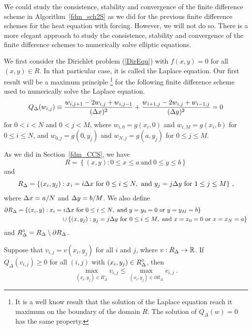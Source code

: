 We could study the consistence, stability and convergence of
the finite difference scheme in Algorithm~\ref{fdm_sch2S} as we did
for the previous finite difference schemes for the heat equation
with forcing.  However, we will not do so.  There is a more elegant
approach to study the consistence, stability and convergence of
the finite difference schemes to numerically solve elliptic equations.

We first consider the Dirichlet problem (\ref{DirEqu}) with  
$f(x,y) = 0$ for all $(x,y) \in R$.  In that particular case, it is
called the Laplace equation.  Our first result will be a
maximum principle \footnote{It is a well know result that the solution
of the Laplace equation reach it maximum on the boundary of the
domain $R$.  The solution of $Q_\Delta(w) = 0$ has the same property.}
for the following finite difference scheme used to numerically solve
the Laplace equation.
\[
Q_\Delta(w_{i,j}) \equiv \frac{w_{i,j+1} - 2w_{i,j} + w_{i,j-1}}{(\Delta{x})^2}
+ \frac{w_{i+1,j} - 2w_{i,j} + w_{i-1,j}}{(\Delta{y})^2} = 0
\]
for $0 < i < N$ and $0 < j < M$, where
$w_{i,0} = g(x_i,0)$ and $w_{i,M} = g(x_i,b)$ for $0\leq i \leq N$, and
$w_{0,j} = g(0,y_j)$ and $w_{N,j} = g(a,y_j)$ for $0\leq j \leq M$.

As we did in Section~\ref{fdm_CCS}, we have
\[
  R = \left\{ (x,y) : 0\leq x \leq a \ \text{and} \ 0 \leq y \leq b \right\}
\]
and
\[
R_\Delta = \{ (x_i,y_j) : x_i = i \dtx{x} \ \text{for} \ 0 \leq i \leq N,
\ \text{and} \ y_j = j \dtx{y} \ \text{for} \ 1 \leq j \leq M \} \ ,
\]
where $\Delta{x} = a/N$ and $\Delta{y}=b/M$.  We also define
\begin{align*}
\partial R_\Delta = \{ (x_i,y) : x_i &= i \Delta{x} \ \text{for}
\ 0 \leq i \leq N, \ \text{and} \ y = y_0 = 0 \ \text{or}\ y = y_M = b \} \\
& \quad  \cup
\{ (x,y_j) : y_j = j \Delta{y} \ \text{for} \ 0 \leq i \leq M,
\ \text{and} \ x = x_0 = 0 \ \text{or}\ x = x_N = a \}
\end{align*}
and $\displaystyle R^\circ_\Delta = R_\Delta \setminus \partial R_\Delta$.

\begin{theorem} \label{LaplaceMaxPrinc}
Suppose that $v_{i,j} = v(x_i,y_j)$ for all $i$ and $j$, where
$v:R_\Delta \to \mathbb{R}$.  If $Q_\Delta(v_{i,j}) \geq 0$ for all $(i,j)$ with
$\displaystyle (x_i,y_j)\in R^\circ_\Delta$, then
\[
  \max_{(x_i,y_j) \in R^\circ_\Delta} v_{i,j}
  \leq \max_{(x_i,y_j) \in \partial R_\Delta} v_{i,j} \ .
\]  
\end{theorem}

